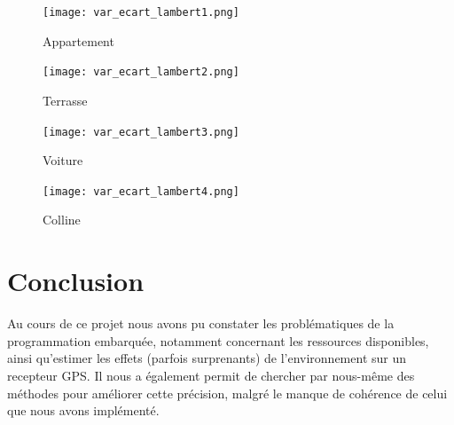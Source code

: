 \documentclass[a4paper,12pt]{article}
\begin{document}
\begin{figure}[htbp] 
  \label{ fig3} 
  \begin{minipage}[b]{0.5\linewidth}
    \centering
    \texttt{[image: var\_ecart\_lambert1.png]} 
    \caption{Appartement} 
    \vspace{4ex}
  \end{minipage}%
  \begin{minipage}[b]{0.5\linewidth}
    \centering
    \texttt{[image: var\_ecart\_lambert2.png]} 
    \caption{Terrasse} 
    \vspace{4ex}
  \end{minipage} 
  \begin{minipage}[b]{0.5\linewidth}
    \centering
    \texttt{[image: var\_ecart\_lambert3.png]} 
    \caption{Voiture} 
    \vspace{4ex}
  \end{minipage} 
  \begin{minipage}[b]{0.5\linewidth}
    \centering
    \texttt{[image: var\_ecart\_lambert4.png]} 
    \caption{Colline} 
    \vspace{4ex}
  \end{minipage}%
\end{figure}
\newpage

\section*{Conclusion}

Au cours de ce projet nous avons pu constater les problématiques de la programmation embarquée, notamment concernant les ressources disponibles, ainsi qu'estimer les effets (parfois surprenants) de l'environnement sur un recepteur GPS. Il nous a également permit de chercher par nous-même des méthodes pour améliorer cette précision, malgré le manque de cohérence de celui que nous avons implémenté. 
\end{document}
